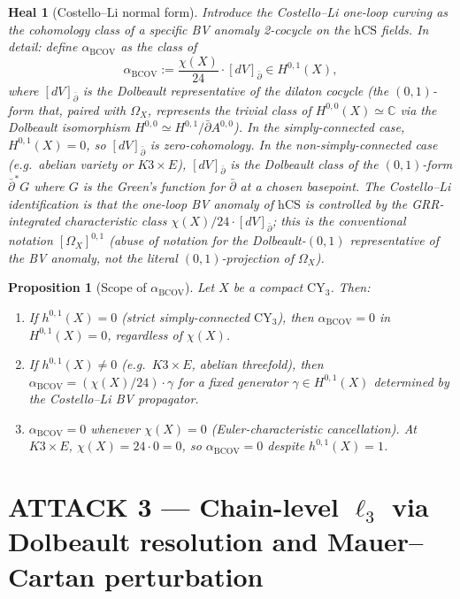 \documentclass[11pt]{article}
\newtheorem{proposition}[theorem]{Proposition}
\newtheorem{heal}[theorem]{Heal}
\providecommand{\CY}{\mathrm{CY}}
\providecommand{\BCOV}{\mathrm{BCOV}}
\providecommand{\hCS}{\mathrm{hCS}}
\providecommand{\Om}{\Omega}
\providecommand{\CC}{\mathbb{C}}
\begin{document}
\begin{heal}[Costello--Li normal form]
\label{heal:2}
Introduce the Costello--Li one-loop curving as the cohomology class of a
specific BV anomaly 2-cocycle on the $\hCS$ fields. In detail: define
$\alpha_\BCOV$ as the class of
\[
  \alpha_\BCOV := \frac{\chi(X)}{24} \cdot [dV]_{\bar\partial} \in
  H^{0,1}(X),
\]
where $[dV]_{\bar\partial}$ is the Dolbeault representative of the
\emph{dilaton cocycle} (the $(0,1)$-form that, paired with $\Om_X$,
represents the trivial class of $H^{0,0}(X) \simeq \CC$ via the Dolbeault
isomorphism $H^{0,0} \simeq H^{0,1} / \bar\partial A^{0,0}$). In the
simply-connected case, $H^{0,1}(X) = 0$, so $[dV]_{\bar\partial}$ is
zero-cohomology. In the non-simply-connected case (e.g.\ abelian variety
or $K3 \times E$), $[dV]_{\bar\partial}$ is the Dolbeault class of the
$(0,1)$-form $\bar\partial^* G$ where $G$ is the Green's function for
$\bar\partial$ at a chosen basepoint. The Costello--Li identification
is that the one-loop BV anomaly of $\hCS$ is controlled by the
GRR-integrated characteristic class $\chi(X)/24 \cdot [dV]_{\bar\partial}$;
this is the conventional notation $[\Om_X]^{0,1}$ (abuse of notation
for the Dolbeault-$(0,1)$ representative of the BV anomaly, not the
literal $(0,1)$-projection of $\Om_X$).
\end{heal}

\begin{proposition}[Scope of $\alpha_\BCOV$]
\label{prop:alpha-bcov-scope}
Let $X$ be a compact $\CY_3$. Then:
\begin{enumerate}
\item If $h^{0,1}(X) = 0$ (strict simply-connected $\CY_3$), then
$\alpha_\BCOV = 0$ in $H^{0,1}(X) = 0$, regardless of $\chi(X)$.
\item If $h^{0,1}(X) \neq 0$ (e.g.\ $K3 \times E$, abelian threefold),
then $\alpha_\BCOV = (\chi(X)/24) \cdot \gamma$ for a fixed generator
$\gamma \in H^{0,1}(X)$ determined by the Costello--Li BV propagator.
\item $\alpha_\BCOV = 0$ whenever $\chi(X) = 0$ (Euler-characteristic
cancellation). At $K3 \times E$, $\chi(X) = 24 \cdot 0 = 0$, so
$\alpha_\BCOV = 0$ despite $h^{0,1}(X) = 1$.
\end{enumerate}
\end{proposition}

\section{ATTACK 3 --- Chain-level $\ell_3$ via Dolbeault
resolution and Mauer--Cartan perturbation}
\label{sec:attack-3}
\end{document}
